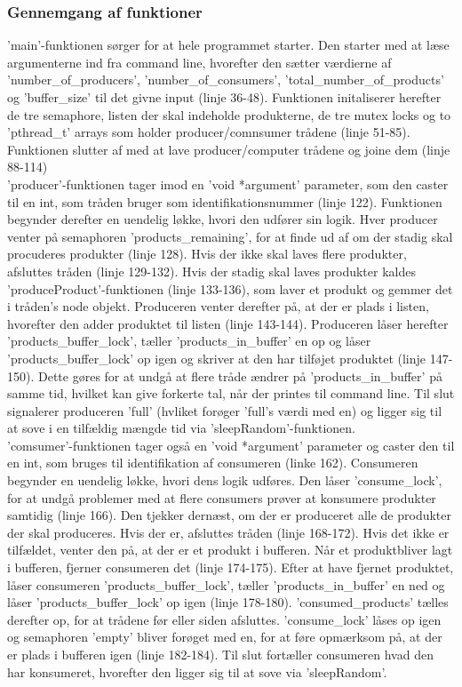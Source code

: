 \subsubsection{Gennemgang af funktioner}
\label{O3_Funktioner}
'main'-funktionen sørger for at hele programmet starter. Den starter med at læse argumenterne ind fra command line, hvorefter den sætter værdierne af 'number_of_producers', 'number_of_consumers', 'total_number_of_products' og 'buffer_size' til det givne input (linje 36-48). Funktionen initaliserer herefter de tre semaphore, listen der skal indeholde produkterne, de tre mutex locks og to 'pthread_t' arrays som holder producer/comnsumer trådene (linje 51-85). Funktionen slutter af med at lave producer/computer trådene og joine dem (linje 88-114)
\\ 'producer'-funktionen tager imod en 'void *argument' parameter, som den caster til en int, som tråden bruger som identifikationsnummer (linje 122). Funktionen begynder derefter en uendelig løkke, hvori den udfører sin logik. Hver producer venter på semaphoren 'products_remaining', for at finde ud af om der stadig skal procuderes produkter (linje 128). Hvis der ikke skal laves flere produkter, afsluttes tråden (linje 129-132). Hvis der stadig skal laves produkter kaldes 'produceProduct'-funktionen (linje 133-136), som laver et produkt og gemmer det i tråden's node objekt. Produceren venter derefter på, at der er plads i listen, hvorefter den adder produktet til listen (linje 143-144). Produceren låser herefter 'products_buffer_lock', tæller 'products_in_buffer' en op og låser 'products_buffer_lock' op igen og skriver at den har tilføjet produktet (linje 147-150). Dette gøres for at undgå at flere tråde ændrer på 'products_in_buffer' på samme tid, hvilket kan give forkerte tal, når der printes til command line. Til slut signalerer produceren 'full' (hvliket forøger 'full's værdi med en) og ligger sig til at sove i en tilfældig mængde tid via 'sleepRandom'-funktionen.
\\ 'comsumer'-funktionen tager også en 'void *argument' parameter og caster den til en int, som bruges til identifikation af consumeren (linke 162). Consumeren begynder en uendelig løkke, hvori dens logik udføres. Den låser 'consume_lock', for at undgå problemer med at flere consumers prøver at konsumere produkter samtidig (linje 166). Den tjekker dernæst, om der er produceret alle de produkter der skal produceres. Hvis der er, afsluttes tråden (linje 168-172). Hvis det ikke er tilfældet, venter den på, at der er et produkt i bufferen. Når et produktbliver lagt i bufferen, fjerner consumeren det (linje 174-175). Efter at have fjernet produktet, låser consumeren 'products_buffer_lock', tæller 'products_in_buffer' en ned og låser 'products_buffer_lock' op igen (linje 178-180). 'consumed_products' tælles derefter op, for at trådene før eller siden afsluttes. 'consume_lock' låses op igen og semaphoren 'empty' bliver forøget med en, for at føre opmærksom på, at der er plads i bufferen igen (linje 182-184). Til slut fortæller consumeren hvad den har konsumeret, hvorefter den ligger sig til at sove via 'sleepRandom'.
